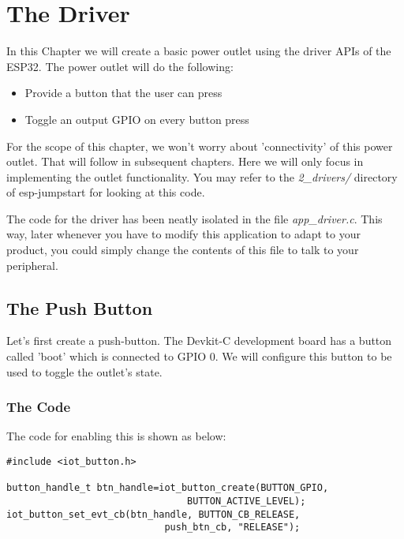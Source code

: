 \documentclass[main.tex]{subfiles}
\begin{document}
\chapter{The Driver} \label{the-outlet}

In this Chapter we will create a basic power outlet using the driver APIs of the ESP32. The power outlet will do the following:
\begin{itemize}
    \item Provide a button that the user can press
    \item Toggle an output GPIO on every button press
\end{itemize}
For the scope of this chapter, we won't worry about 'connectivity' of this power outlet. That will follow in subsequent chapters. Here we will only focus in implementing the outlet functionality. You may refer to the \textit{2\_drivers/} directory of esp-jumpstart for looking at this code. 

The code for the driver has been neatly isolated in the file \textit{app\_driver.c}. This way, later whenever you have to modify this application to adapt to your product, you could simply change the contents of this file to talk to your peripheral.

\section{The Push Button}
Let's first create a push-button. The Devkit-C development board has a button called 'boot' which is connected to GPIO 0. We will configure this button to be used to toggle the outlet's state.


\subsection{The Code}\label{sec:push_button}
The code for enabling this is shown as below:
\begin{verbatim}
#include <iot_button.h>

button_handle_t btn_handle=iot_button_create(BUTTON_GPIO,
                                BUTTON_ACTIVE_LEVEL);
iot_button_set_evt_cb(btn_handle, BUTTON_CB_RELEASE,
                            push_btn_cb, "RELEASE");

\end{verbatim}
\end{document}
